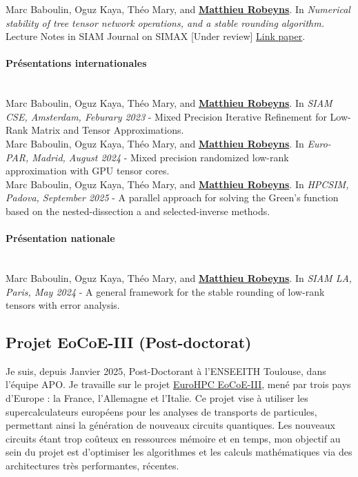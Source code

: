 \noindent
Marc Baboulin, Oguz Kaya, Théo Mary, and \underline{\bfseries Matthieu Robeyns}.
In \textit{Numerical stability of tree tensor network operations, and a stable rounding algorithm.}
Lecture Notes in SIAM Journal on SIMAX [Under review]
\href{https://hal.science/hal-04996127}{Link paper}.
\mbox{}\\[10pt]

\paragraph*{Présentations internationales}\mbox{}\\[5pt]
Marc Baboulin, Oguz Kaya, Théo Mary, and \underline{\bfseries Matthieu Robeyns}.
In \textit{SIAM CSE, Amsterdam, Feburary 2023} - Mixed Precision Iterative Refinement for Low-Rank Matrix and Tensor Approximations.
\mbox{}\\[10pt]

\noindent
Marc Baboulin, Oguz Kaya, Théo Mary, and \underline{\bfseries Matthieu Robeyns}.
In \textit{Euro-PAR, Madrid, August 2024} - Mixed precision randomized low-rank approximation with GPU tensor cores.
\mbox{}\\[10pt]

\noindent
Marc Baboulin, Oguz Kaya, Théo Mary, and \underline{\bfseries Matthieu Robeyns}.
In \textit{HPCSIM, Padova, September 2025} - A parallel approach for solving the Green's function based on the nested-dissection a and selected-inverse methods.
\mbox{}\\[10pt]

\paragraph*{Présentation nationale}\mbox{}\\[5pt]
Marc Baboulin, Oguz Kaya, Théo Mary, and \underline{\bfseries Matthieu Robeyns}.
In \textit{SIAM LA, Paris, May 2024} - A general framework for the stable rounding of low-rank tensors with error analysis.
\mbox{}\\[10pt]

\subsection{Projet EoCoE-III (Post-doctorat)}

Je suis, depuis Janvier 2025, Post-Doctorant à l'ENSEEITH Toulouse, dans
l'équipe APO. Je travaille sur le projet
\href{https://www.eurohpc-ju.europa.eu/research-innovation/our-projects/eocoe-iii_en}{EuroHPC
    EoCoE-III}, mené par trois pays d'Europe : la France, l'Allemagne et l'Italie.
Ce projet vise à utiliser les supercalculateurs européens pour les analyses de
transports de particules, permettant ainsi la génération de nouveaux circuits
quantiques. Les nouveaux circuits étant trop coûteux en ressources mémoire et
en temps, mon objectif au sein du projet est d'optimiser les algorithmes et les
calculs mathématiques via des architectures très performantes, récentes.

